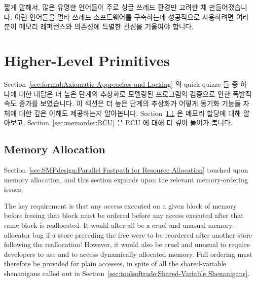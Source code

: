 짧게 말해서, 많은 유명한 언어들이 주로 싱글 쓰레드 환경만 고려한 채
만들어졌습니다.
이런 언어들을 멀티 쓰레드 소프트웨어를 구축하는데 성공적으로 사용하려면
여러분이 메모리 레퍼런스와 의존성에 특별한 관심을 기울여야 합니다.

\section{Higher-Level Primitives}
\label{sec:memorder:Higher-Level Primitives}

Section~\ref{sec:formal:Axiomatic Approaches and Locking}
의 quick quizze 들 중 하나에 대한 대답은 더 높은 단계의 추상화로 모델링된
프로그램의 검증으로 인한 폭발적 속도 증가를 보였습니다.
이 섹션은 더 높은 단계의 추상화가 어떻게 동기화 기능들 자체에 대한 깊은 이해도
제공하는지 알아봅니다.
Section~\ref{sec:memorder:Memory Allocation}
은 메모리 할당에 대해 알아보고,
Section~\ref{sec:memorder:RCU}
은 RCU 에 대해 더 깊이 들어가 봅니다.

\subsection{Memory Allocation}
\label{sec:memorder:Memory Allocation}

Section~\ref{sec:SMPdesign:Parallel Fastpath for Resource Allocation}
touched upon memory allocation, and this section expands upon the relevant
memory-ordering issues.

The key requirement is that any access executed on a given block of
memory before freeing that block must be ordered before any access
executed after that same block is reallocated.
It would after all be a cruel and unusual memory-allocator bug if a store
preceding the free were to be reordered after another store following
the reallocation!
However, it would also be cruel and unusual to require developers to use
 and  to access dynamically allocated
memory.
Full ordering must therefore be provided for plain accesses, in spite of
all the shared-variable shenanigans called out in
Section~\ref{sec:toolsoftrade:Shared-Variable Shenanigans}.


